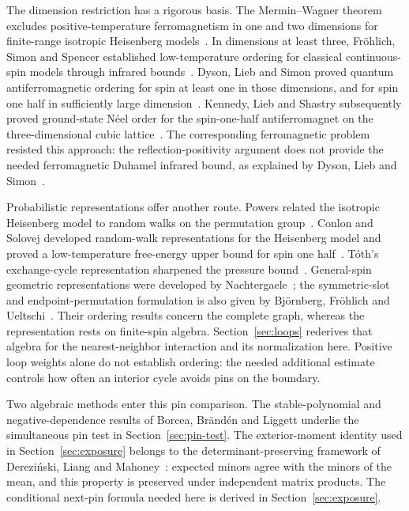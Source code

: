 The dimension restriction has a rigorous basis.  The Mermin--Wagner
theorem excludes positive-temperature ferromagnetism in one and two
dimensions for finite-range isotropic Heisenberg
models~\cite{MerminWagner1966}.  In dimensions at least three,
Fr\"ohlich, Simon and Spencer established low-temperature ordering for
classical continuous-spin models through infrared
bounds~\cite[Theorem~3.1]{FrohlichSimonSpencer1976}.
Dyson, Lieb and Simon proved quantum antiferromagnetic ordering for spin
at least one in those dimensions, and for spin one half in sufficiently
large dimension~\cite[Theorem~6.2]{DysonLiebSimon1978}.
Kennedy, Lieb and Shastry subsequently proved ground-state N\'eel order
for the spin-one-half antiferromagnet on the three-dimensional cubic
lattice~\cite{KennedyLiebShastry1988}.  The corresponding ferromagnetic
problem resisted this approach: the reflection-positivity argument does
not provide the needed ferromagnetic Duhamel infrared bound, as explained
by Dyson, Lieb and Simon~\cite[pp.~339--340]{DysonLiebSimon1978}.

Probabilistic representations offer another route.  Powers related the
isotropic Heisenberg model to random walks on the permutation
group~\cite{Powers1976}.  Conlon and Solovej
developed random-walk representations for the Heisenberg model and
proved a low-temperature free-energy upper bound for spin one
half~\cite{ConlonSolovej1991Representation,ConlonSolovej1991UpperBound}.
T\'oth's exchange-cycle representation sharpened the pressure
bound~\cite{Toth1993}.  General-spin geometric representations were
developed by Nachtergaele~\cite{Nachtergaele1994Stochastic,Nachtergaele1994Quasistates};
the symmetric-slot and endpoint-permutation formulation is also given
by Bj\"ornberg, Fr\"ohlich and Ueltschi~\cite[Section~3.2]{BjornbergFrohlichUeltschi2020}.
Their ordering results concern the complete graph, whereas the
representation rests on finite-spin algebra.  Section~\ref{sec:loops}
rederives that algebra for the nearest-neighbor interaction and its
normalization here.  Positive loop weights alone do not establish
ordering: the needed additional estimate controls how often an interior
cycle avoids pins on the boundary.

Two algebraic methods enter this pin comparison.  The stable-polynomial
and negative-dependence results of Borcea, Br\"and\'en and Liggett
\cite{BorceaBrandenLiggett2009} underlie the simultaneous pin test in
Section~\ref{sec:pin-test}.  The exterior-moment identity used in
Section~\ref{sec:exposure} belongs to the determinant-preserving framework
of Derezi\'nski, Liang and Mahoney~\cite{DerezinskiLiangMahoney2020}:
expected minors agree with the minors of the mean, and this property
is preserved under independent matrix products.  The conditional
next-pin formula needed here is derived in Section~\ref{sec:exposure}.

